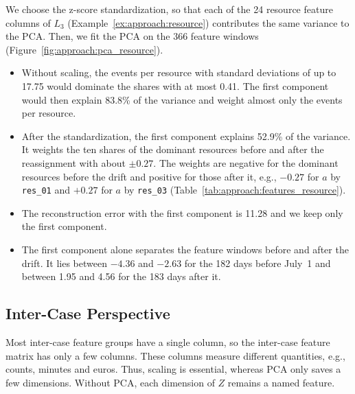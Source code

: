 \begin{example}
	\label{ex:approach:reduction_resource}
	We choose the z-score standardization, so that each of the 24 resource feature columns of $L_3$ (Example~\ref{ex:approach:resource}) contributes the same variance to the PCA. Then, we fit the PCA on the 366 feature windows (Figure~\ref{fig:approach:pca_resource}).
	\begin{itemize}
		\item Without scaling, the events per resource with standard deviations of up to 17.75 would dominate the shares with at most 0.41. The first component would then explain 83.8\% of the variance and weight almost only the events per resource.

		\item After the standardization, the first component explains 52.9\% of the variance. It weights the ten shares of the dominant resources before and after the reassignment with about $\pm 0.27$. The weights are negative for the dominant resources before the drift and positive for those after it, e.g., $-0.27$ for $a$ by \texttt{res\_01} and $+0.27$ for $a$ by \texttt{res\_03} (Table~\ref{tab:approach:features_resource}).

		\item The reconstruction error with the first component is 11.28 and we keep only the first component.

		\item The first component alone separates the feature windows before and after the drift. It lies between $-4.36$ and $-2.63$ for the 182 days before July~1 and between 1.95 and 4.56 for the 183 days after it.
	\end{itemize}
\end{example}

\subsection{Inter-Case Perspective}
\label{sec:approach:reduction:inter}
Most inter-case feature groups have a single column, so the inter-case feature matrix has only a few columns. These columns measure different quantities, e.g., counts, minutes and euros. Thus, scaling is essential, whereas PCA only saves a few dimensions. Without PCA, each dimension of $Z$ remains a named feature.


